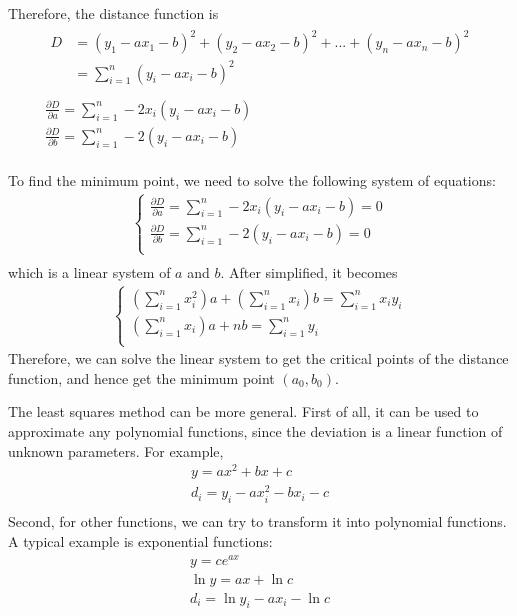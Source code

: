 \documentclass{article}
\begin{document}
Therefore, the distance function is 
\begin{gather*}
  \begin{split}
    D &= (y_1 - ax_1 - b)^2 + (y_2 - ax_2 - b)^2 + ... + (y_n - ax_n - b)^2 \\
      &= \sum_{i=1}^{n}(y_i - ax_i - b)^2 \\
  \end{split} \\
  \frac{\partial D}{\partial a} = \sum_{i=1}^{n}-2x_i(y_i - ax_i - b) \\
  \frac{\partial D}{\partial b} = \sum_{i=1}^{n}-2(y_i - ax_i - b) \\
\end{gather*}

To find the minimum point, we need to solve the following system of equations:
\begin{gather*}
  \begin{cases}
    \frac{\partial D}{\partial a} = \sum_{i=1}^{n}-2x_i(y_i - ax_i - b) = 0 \\
    \frac{\partial D}{\partial b} = \sum_{i=1}^{n}-2(y_i - ax_i - b) = 0 \\
  \end{cases} \\
\end{gather*}
which is a linear system of $a$ and $b$. After simplified, it becomes
\begin{gather*}
  \begin{cases}
    (\sum_{i=1}^{n}x_i^2)a + (\sum_{i=1}^{n}x_i)b = \sum_{i=1}^{n}x_iy_i \\
    (\sum_{i=1}^{n}x_i)a + nb = \sum_{i=1}^{n}y_i \\
  \end{cases}
\end{gather*}
Therefore, we can solve the linear system to get the critical points of the 
distance function, and hence get the minimum point $(a_0, b_0)$.

\bigskip

The least squares method can be more general. First of all, it can be used to 
approximate any polynomial functions, since the deviation is a linear function 
of unknown parameters. For example,
\begin{gather*}
  y = ax^2 + bx + c \\
  d_i = y_i - ax_i^2 - bx_i - c \\
\end{gather*}
Second, for other functions, we can try to transform it into polynomial 
functions. A typical example is exponential functions:
\begin{gather*}
  y = ce^{ax} \\
  \ln y = ax + \ln c \\
  d_i = \ln y_i - ax_i - \ln c \\
\end{gather*}
\end{document}
